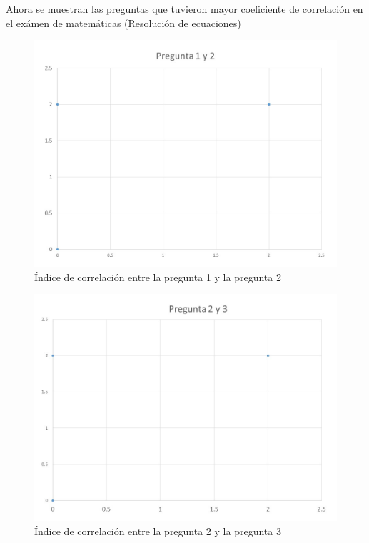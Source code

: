 \documentclass[12pt] {report}
\begin{document}
Ahora se muestran las preguntas que tuvieron mayor coeficiente de correlación en el exámen de matemáticas (Resolución de ecuaciones)

\begin{figure}[H]
\centering 
\includegraphics[scale=.7]{MCorrelacionmax12.JPG}
\caption{Índice de correlación entre la pregunta 1 y la pregunta 2}
\end{figure}

\begin{figure}[H]
\centering 
\includegraphics[scale=.7]{MCorrelacionmax23.JPG}
\caption{Índice de correlación entre la pregunta 2 y la pregunta 3}
\end{figure}
\end{document}
